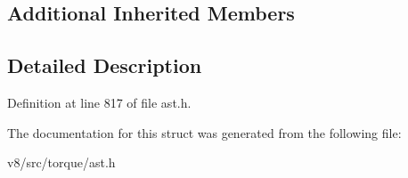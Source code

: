 \subsection*{Additional Inherited Members}


\subsection{Detailed Description}


Definition at line 817 of file ast.\+h.



The documentation for this struct was generated from the following file\+:\begin{DoxyCompactItemize}
\item 
v8/src/torque/ast.\+h\end{DoxyCompactItemize}
